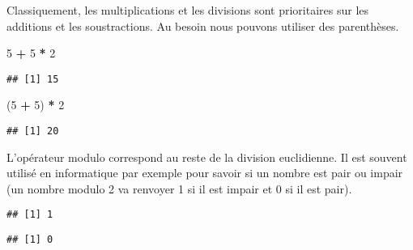\documentclass[]{book}
\newenvironment{Shaded}{\begin{snugshade}}{\end{snugshade}}
\newcommand{\DecValTok}[1]{\textcolor[rgb]{0.00,0.00,0.81}{#1}}
\newcommand{\StringTok}[1]{\textcolor[rgb]{0.31,0.60,0.02}{#1}}
\newcommand{\OperatorTok}[1]{\textcolor[rgb]{0.81,0.36,0.00}{\textbf{#1}}}
\newcommand{\NormalTok}[1]{#1}
\theoremstyle{definition}
\theoremstyle{definition}
\theoremstyle{definition}
\theoremstyle{remark}
\begin{document}
Classiquement, les multiplications et les divisions sont prioritaires
sur les additions et les soustractions. Au besoin nous pouvons utiliser
des parenthèses.

\begin{Shaded}
\begin{Highlighting}[]
\DecValTok{5} \OperatorTok{+}\StringTok{ }\DecValTok{5} \OperatorTok{*}\StringTok{ }\DecValTok{2}
\end{Highlighting}
\end{Shaded}

\begin{verbatim}
## [1] 15
\end{verbatim}

\begin{Shaded}
\begin{Highlighting}[]
\NormalTok{(}\DecValTok{5} \OperatorTok{+}\StringTok{ }\DecValTok{5}\NormalTok{) }\OperatorTok{*}\StringTok{ }\DecValTok{2}
\end{Highlighting}
\end{Shaded}

\begin{verbatim}
## [1] 20
\end{verbatim}

L'opérateur modulo correspond au reste de la division euclidienne. Il
est souvent utilisé en informatique par exemple pour savoir si un nombre
est pair ou impair (un nombre modulo 2 va renvoyer 1 si il est impair et
0 si il est pair).

\begin{Shaded}
\end{Shaded}

\begin{verbatim}
## [1] 1
\end{verbatim}

\begin{Shaded}
\end{Shaded}

\begin{verbatim}
## [1] 0
\end{verbatim}

\begin{Shaded}
\end{Shaded}
\end{document}
